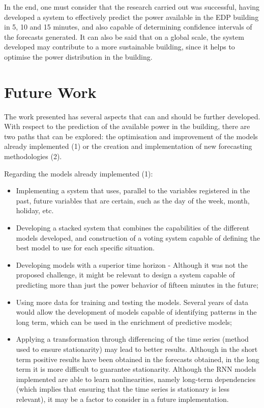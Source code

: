 In the end, one must consider that the research carried out was successful, having developed a system to effectively predict the power available in the \ac{EDP} building in 5, 10 and 15 minutes, and also capable of determining confidence intervals of the forecasts generated. It can also be said that on a global scale, the system developed may contribute to a more sustainable building, since it helps to optimise the power distribution in the building.



\newpage
\section{Future Work}

The work presented has several aspects that can and should be further developed. With respect to the prediction of the available power in the building, there are two paths that can be explored: the optimisation and improvement of the models already implemented (1) or the creation and implementation of new forecasting methodologies (2). 

Regarding the models already implemented (1):   

\begin{itemize}
\setlength\itemsep{0.1em}
    \item Implementing a system that uses, parallel to the variables registered in the past, future variables that are certain, such as the day of the week, month, holiday, etc.
    \item Developing a stacked system that combines the capabilities of the different models developed, and construction of a voting system capable of defining the best model to use for each specific situation.
    \item Developing models with a superior time horizon - Although it was not the proposed challenge, it might be relevant to design a system capable of predicting more than just the power behavior of fifteen minutes in the future;
    \item Using more data for training and testing the models. Several years of data would allow the development of models capable of identifying patterns in the long term, which can be used in the enrichment of predictive models;
    \item Applying a transformation through differencing  of the time series (method used to ensure stationarity) may lead to better results. Although in the short term positive results have been obtained in the forecasts obtained, in the long term it is more difficult to guarantee stationarity. Although the \ac{RNN} models implemented are able to learn nonlinearities, namely long-term dependencies (which implies that ensuring that the time series is stationary is less relevant), it may be a factor to consider in a future implementation.
\end{itemize}

